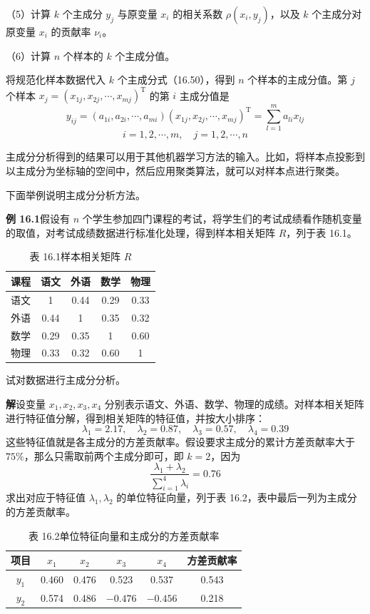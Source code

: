 \documentclass[UTF8, 12pt, fontset=fandol, oneside]{ctexart}
\begin{document}
（5）计算 $k$ 个主成分 $y_j$ 与原变量 $x_i$ 的相关系数 $\rho(x_i,y_j)$，以及 $k$ 个主成分对原变量 $x_i$ 的贡献率 $\nu_i$。

（6）计算 $n$ 个样本的 $k$ 个主成分值。

将规范化样本数据代入 $k$ 个主成分式（16.50），得到 $n$ 个样本的主成分值。第 $j$ 个样本 $x_j=(x_{1j},x_{2j},\cdots,x_{mj})^{\mathrm{T}}$ 的第 $i$ 主成分值是
\[
y_{ij}=(a_{1i},a_{2i},\cdots,a_{mi})(x_{1j},x_{2j},\cdots,x_{mj})^{\mathrm{T}}
=\sum_{l=1}^m a_{li}x_{lj}
\]
\[
i=1,2,\cdots,m,\quad j=1,2,\cdots,n
\]

主成分分析得到的结果可以用于其他机器学习方法的输入。比如，将样本点投影到以主成分为坐标轴的空间中，然后应用聚类算法，就可以对样本点进行聚类。

下面举例说明主成分分析方法。

\noindent\textbf{例 16.1}\quad 假设有 $n$ 个学生参加四门课程的考试，将学生们的考试成绩看作随机变量的取值，对考试成绩数据进行标准化处理，得到样本相关矩阵 $R$，列于表 16.1。

\begin{table}[htbp]
\centering
\caption*{表 16.1\quad 样本相关矩阵 $R$}
\begin{tabular}{ccccc}
\toprule
课程 & 语文 & 外语 & 数学 & 物理\\
\midrule
语文 & 1 & 0.44 & 0.29 & 0.33\\
外语 & 0.44 & 1 & 0.35 & 0.32\\
数学 & 0.29 & 0.35 & 1 & 0.60\\
物理 & 0.33 & 0.32 & 0.60 & 1\\
\bottomrule
\end{tabular}
\end{table}

试对数据进行主成分分析。

\noindent\textbf{解}\quad 设变量 $x_1,x_2,x_3,x_4$ 分别表示语文、外语、数学、物理的成绩。对样本相关矩阵进行特征值分解，得到相关矩阵的特征值，并按大小排序：
\[
\lambda_1=2.17,\quad \lambda_2=0.87,\quad \lambda_3=0.57,\quad \lambda_4=0.39
\]
这些特征值就是各主成分的方差贡献率。假设要求主成分的累计方差贡献率大于 $75\%$，那么只需取前两个主成分即可，即 $k=2$，因为
\[
\frac{\lambda_1+\lambda_2}{\displaystyle\sum_{i=1}^4\lambda_i}=0.76
\]
求出对应于特征值 $\lambda_1,\lambda_2$ 的单位特征向量，列于表 16.2，表中最后一列为主成分的方差贡献率。

\begin{table}[htbp]
\centering
\caption*{表 16.2\quad 单位特征向量和主成分的方差贡献率}
\begin{tabular}{cccccc}
\toprule
项目 & $x_1$ & $x_2$ & $x_3$ & $x_4$ & 方差贡献率\\
\midrule
$y_1$ & 0.460 & 0.476 & 0.523 & 0.537 & 0.543\\
$y_2$ & 0.574 & 0.486 & $-0.476$ & $-0.456$ & 0.218\\
\bottomrule
\end{tabular}
\end{table}
\end{document}
